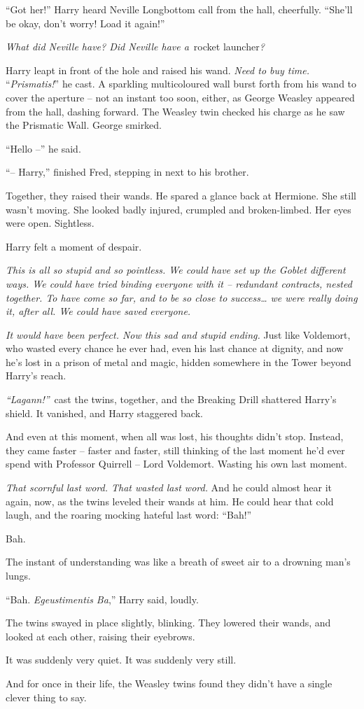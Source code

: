 ``Got her!'' Harry heard Neville Longbottom call from the hall,
cheerfully. ``She'll be okay, don't worry! Load it again!''

\emph{What did Neville have? Did Neville have a}~rocket launcher\emph{?}

Harry leapt in front of the hole and raised his wand. \emph{Need to buy
time.} ``\emph{Prismatis!}'' he cast. A sparkling multicoloured wall
burst forth from his wand to cover the aperture -- not an instant too
soon, either, as George Weasley appeared from the hall, dashing forward.
The Weasley twin checked his charge as he saw the Prismatic Wall. George
smirked.

``Hello --'' he said.

``-- Harry,'' finished Fred, stepping in next to his brother.

Together, they raised their wands. He spared a glance back at Hermione.
She still wasn't moving. She looked badly injured, crumpled and
broken-limbed. Her eyes were open. Sightless.

Harry felt a moment of despair.

\emph{This is all so stupid and so pointless. We could have set up the
Goblet different ways. We could have tried binding everyone with it --
redundant contracts, nested together. To have come so far, and to be so
close to success\ldots{} we were really doing it, after all. We could
have saved everyone.}

\emph{It would have been perfect. Now this sad and stupid ending.} Just
like Voldemort, who wasted every chance he ever had, even his last
chance at dignity, and now he's lost in a prison of metal and magic,
hidden somewhere in the Tower beyond Harry's reach.

\emph{``Lagann!''}~cast the twins, together, and the Breaking Drill
shattered Harry's shield. It vanished, and Harry staggered back.

And even at this moment, when all was lost, his thoughts didn't stop.
Instead, they came faster -- faster and faster, still thinking of the
last moment he'd ever spend with Professor Quirrell -- Lord Voldemort.
Wasting his own last moment.

\emph{That scornful last word. That wasted last word.} And he could
almost hear it again, now, as the twins leveled their wands at him. He
could hear that cold laugh, and the roaring mocking hateful last word:
``Bah!''

Bah.

The instant of understanding was like a breath of sweet air to a
drowning man's lungs.

``Bah. \emph{Egeustimentis Ba},'' Harry said, loudly.

The twins swayed in place slightly, blinking. They lowered their wands,
and looked at each other, raising their eyebrows.

It was suddenly very quiet. It was suddenly very still.

And for once in their life, the Weasley twins found they didn't have a
single clever thing to say.
